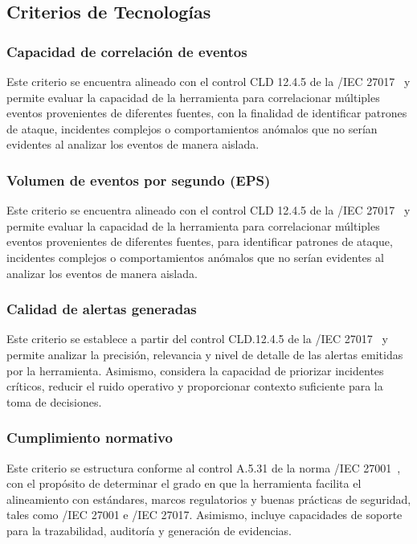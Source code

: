 \subsection{Criterios de Tecnologías \SIEM}
\subsubsection{Capacidad de correlación de eventos}

Este criterio se encuentra alineado con el control CLD 12.4.5 de la \ISO/IEC 27017~\cite{iso27017} y permite evaluar la capacidad de la 
herramienta para correlacionar múltiples eventos provenientes de diferentes fuentes, con la finalidad de identificar patrones de ataque, 
incidentes complejos o comportamientos anómalos que no serían evidentes al analizar los eventos de manera aislada.

\subsubsection{Volumen de eventos por segundo (EPS)}

Este criterio se encuentra alineado con el control CLD 12.4.5 de la \ISO/IEC 27017~\cite{iso27017} y permite evaluar la capacidad de la 
herramienta para correlacionar múltiples eventos provenientes de diferentes fuentes, para identificar patrones de ataque, 
incidentes complejos o comportamientos anómalos que no serían evidentes al analizar los eventos de manera aislada.

\subsubsection{Calidad de alertas generadas}

Este criterio se establece a partir del control CLD.12.4.5 de la \ISO/IEC 27017~\cite{iso27017} y permite analizar la precisión, relevancia 
y nivel de detalle de las alertas emitidas por la herramienta. Asimismo, considera la capacidad de priorizar incidentes críticos, reducir 
el ruido operativo y proporcionar contexto suficiente para la toma de decisiones.

\subsubsection{Cumplimiento normativo}

Este criterio se estructura conforme al control A.5.31 de la norma \ISO/IEC 27001~\cite{iso27017}, con el propósito de determinar el 
grado en que la herramienta facilita el alineamiento con estándares, marcos regulatorios y buenas prácticas de seguridad, tales como 
\ISO/IEC 27001 e \ISO/IEC 27017. Asimismo, incluye capacidades de soporte para la trazabilidad, auditoría y generación de 
evidencias.

